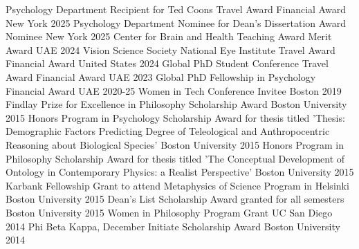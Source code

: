 \begin{cvhonors}
  \cvhonor  
    {Psychology Department Recipient for Ted Coons Travel Award}
    {Financial Award}
    {New York}
    {2025}
  \cvhonor  
    {Psychology Department Nominee for Dean's Dissertation Award}
    {Nominee}
    {New York}
    {2025}
  \cvhonor  
    {Center for Brain and Health Teaching Award}
    {Merit Award}
    {UAE}
    {2024}
  \cvhonor  
    {Vision Science Society National Eye Institute Travel Award}
    {Financial Award}
    {United States}
    {2024}
  \cvhonor  
    {Global PhD Student Conference Travel Award}
    {Financial Award}
    {UAE}
    {2023}
   \cvhonor  
    {Global PhD Fellowship in Psychology}
    {Financial Award}
    {UAE}
    {2020-25}
  \cvhonor  
    {Women in Tech Conference}
    {Invitee}
    {Boston}
    {2019}
  \cvhonor  
    {Findlay Prize for Excellence in Philosophy}
    {Scholarship Award}
    {Boston University}
    {2015}
  \cvhonor
    {Honors Program in Psychology}
    {Scholarship Award for thesis titled 'Thesis: Demographic Factors Predicting Degree of Teleological and Anthropocentric Reasoning about Biological Species'}
    {Boston University}
    {2015}
  \cvhonor
    {Honors Program in Philosophy}
    {Scholarship Award for thesis titled 'The Conceptual Development of Ontology in Contemporary Physics: a Realist Perspective'}
    {Boston University}
    {2015}
  \cvhonor
    {Karbank Fellowship}
    {Grant to attend Metaphysics of Science Program in Helsinki}
    {Boston University}
    {2015}
  \cvhonor
    {Dean's List}
    {Scholarship Award granted for all semesters}
    {Boston University}
    {2015}
  \cvhonor
    {Women in Philosophy Program}
    {Grant}
    {UC San Diego}
    {2014}
  \cvhonor
    {Phi Beta Kappa, December Initiate}
    {Scholarship Award}
    {Boston University}
    {2014}
\end{cvhonors}
